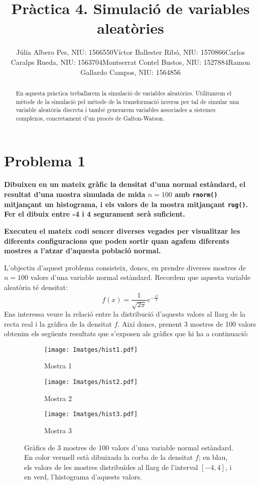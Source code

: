 \documentclass[11pt,a4paper]{article}
\title{\bfseries\Large Pràctica 4. Simulació de variables aleatòries}
\author{Júlia Albero Pes, NIU: 1566550\endgraf Víctor Ballester Ribó, NIU: 1570866\endgraf Carlos Caralps Rueda, NIU: 1563704\endgraf Montserrat Contel Bustos, NIU: 1527884\endgraf Ramon Gallardo Campos, NIU: 1564856}
\date{\parbox{\linewidth}{\centering
  Probabilitat i Modelització Estocàstica\endgraf
  Grau en Matemàtiques\endgraf
  Universitat Autònoma de Barcelona\endgraf
  Gener de 2022}}
\begin{document}
\maketitle
\begin{abstract}
  \noindent En aquesta pràctica treballarem la simulació de variables aleatòries. Utilitzarem el mètode de la simulació pel mètode de la transformació inversa per tal de simular una variable aleatòria discreta i també generarem variables associades a sistemes complexos, concretament d'un procés de Galton-Watson.
\end{abstract}
\thispagestyle{empty}
\newpage
\setcounter{page}{1}
\restoregeometry
\newpage

\section*{Problema 1}
\textbf{Dibuixeu en un mateix gràfic la densitat d'una normal estàndard, el resultat d'una mostra simulada de mida $n = 100$ amb \texttt{rnorm()} mitjançant un histograma, i els valors de la mostra mitjançant \texttt{rug()}. Fer el dibuix entre -4 i 4 segurament serà suficient.}

\textbf{Executeu el mateix codi sencer diverses vegades per visualitzar les diferents configuracions que poden sortir quan agafem diferents mostres a l'atzar d'aquesta població normal.}

L'objectiu d'aquest problema consisteix, doncs, en prendre diverses mostres de $n=100$ valors d'una variable normal estàndard. Recordem que aquesta variable aleatòria té densitat: $$f(x)=\frac{1}{\sqrt{2\pi}}e^{-\frac{x^2}{2}}$$
Ens interessa veure la relació entre la distribució d'aquests valors al llarg de la recta real i la gràfica de la densitat $f$. Així doncs, prenent 3 mostres de 100 valors obtenim els següents resultats que s'exposen als gràfics que hi ha a continuació:
\begin{figure}[ht]
  \centering
  \begin{subfigure}[b]{0.49\textwidth}
    \centering
    \texttt{[image: Imatges/hist1.pdf]}
    \caption{Mostra 1}
  \end{subfigure}
  \hfill
  \begin{subfigure}[b]{0.49\textwidth}
    \centering
    \texttt{[image: Imatges/hist2.pdf]}
    \caption{Mostra 2}
  \end{subfigure}
  \hfill
  \begin{subfigure}[b]{0.49\textwidth}
    \centering
    \texttt{[image: Imatges/hist3.pdf]}
    \caption{Mostra 3}
  \end{subfigure}
  \caption{Gràfics de 3 mostres de 100 valors d'una variable normal estàndard. En color vermell està dibuixada la corba de la densitat $f$; en blau, els valors de les mostres distribuïdes al llarg de l'interval $[-4,4]$, i en verd, l'histograma d'aquests valors.}
\end{figure}
\end{document}
